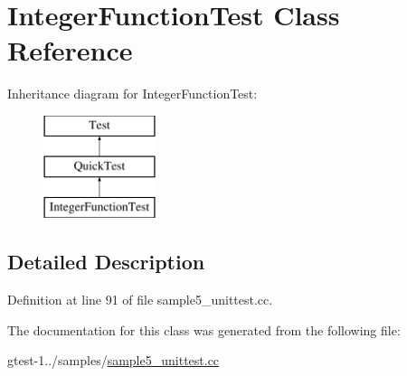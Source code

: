 \hypertarget{classIntegerFunctionTest}{\section{\-Integer\-Function\-Test \-Class \-Reference}
\label{db/dbb/classIntegerFunctionTest}
}
\-Inheritance diagram for \-Integer\-Function\-Test\-:\begin{figure}[H]
\begin{center}
\leavevmode
\includegraphics[height=3.000000cm]{db/dbb/classIntegerFunctionTest}
\end{center}
\end{figure}


\subsection{\-Detailed \-Description}


\-Definition at line 91 of file sample5\-\_\-unittest.\-cc.



\-The documentation for this class was generated from the following file\-:\begin{DoxyCompactItemize}
\item 
gtest-\/1../samples/\hyperlink{sample5__unittest_8cc}{sample5\-\_\-unittest.\-cc}\end{DoxyCompactItemize}

